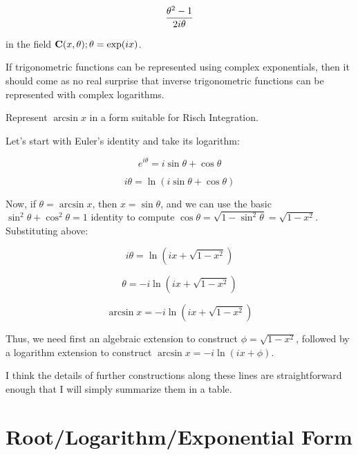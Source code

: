 $${{\theta^2 - 1}\over 2i\theta}$$

in the field ${\bf C}(x,\theta); \theta=\exp(ix)$.

\endexample

If trigonometric functions can be represented using complex
exponentials, then it should come as no real surprise that inverse
trigonometric functions can be represented with complex logarithms.

\example Represent $\arcsin x$ in a form suitable for Risch Integration.

Let's start with Euler's identity and take its logarithm:

$$e^{i\theta}=i\sin\theta+\cos\theta$$

$$i\theta=\ln(i\sin\theta+\cos\theta)$$

Now, if $\theta = \arcsin x$, then $x = \sin \theta$, and we can use
the basic $\sin^2 \theta + \cos^2 \theta = 1$ identity to compute
$\cos \theta = \sqrt{1-\sin^2\theta} = \sqrt{1-x^2}$.  Substituting above:

$$i\theta=\ln(i x+\sqrt{1-x^2})$$

$$\theta=-i\ln(i x+\sqrt{1-x^2})$$

$$\arcsin x=-i\ln(i x+\sqrt{1-x^2})$$

Thus, we need first an algebraic extension to construct $\phi = \sqrt{1-x^2}$,
followed by a logarithm extension to construct $\arcsin x = -i\ln(ix+\phi)$.

\endexample

I think the details of further constructions along these lines are
straightforward enough that I will simply summarize them in a table.

\vfill\eject

\section{Root/Logarithm/Exponential Form}


\def\sech{{\rm sech}}
\def\csch{{\rm csch}}

